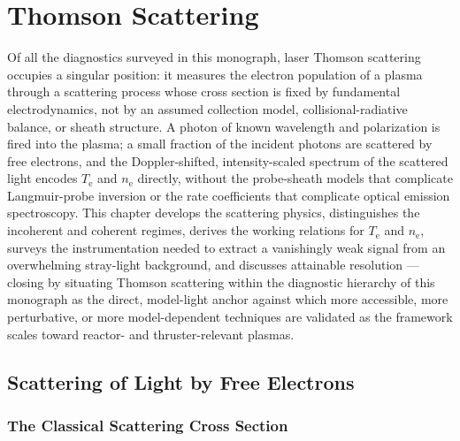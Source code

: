 \chapter{Thomson Scattering}
\label{ch:thomson}

Of all the diagnostics surveyed in this monograph, laser Thomson scattering occupies a singular position: it measures the electron population of a plasma through a scattering process whose cross section is fixed by fundamental electrodynamics, not by an assumed collection model, collisional-radiative balance, or sheath structure. A photon of known wavelength and polarization is fired into the plasma; a small fraction of the incident photons are scattered by free electrons, and the Doppler-shifted, intensity-scaled spectrum of the scattered light encodes $T_{\mathrm{e}}$ and $n_{\mathrm{e}}$ directly, without the probe-sheath models that complicate Langmuir-probe inversion or the rate coefficients that complicate optical emission spectroscopy. This chapter develops the scattering physics, distinguishes the incoherent and coherent regimes, derives the working relations for $T_{\mathrm{e}}$ and $n_{\mathrm{e}}$, surveys the instrumentation needed to extract a vanishingly weak signal from an overwhelming stray-light background, and discusses attainable resolution — closing by situating Thomson scattering within the diagnostic hierarchy of this monograph as the direct, model-light anchor against which more accessible, more perturbative, or more model-dependent techniques are validated as the framework scales toward reactor- and thruster-relevant plasmas.

\section{Scattering of Light by Free Electrons}

\subsection{The Classical Scattering Cross Section}

